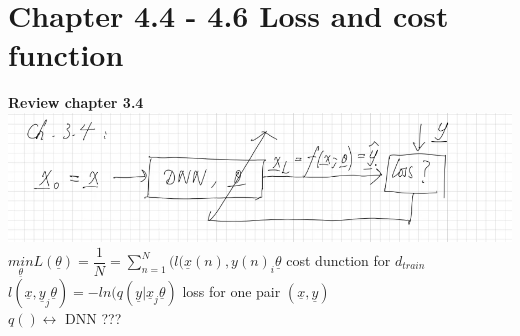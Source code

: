 \section{Chapter 4.4 - 4.6 Loss and cost function}
\textbf{Review chapter 3.4}	\\
\includegraphics[width=\linewidth]{Images/ProbabalisticFrameworkSupervisedLearning.png}\\
$ \underset{\underline{\theta}}{min}  L ( \underline{\theta  }) =  \dfrac{1}{N} = \sum_{n=1}^{N} (l(\underline{x}(n), y(n)_i \underline{\theta}$     cost dunction for $ d_{train } $ \\
$l(\underline{x}, \underline{y}_j \underline{\theta }) = - ln(q ( \underline{y} | \underline{x}_j \underline{\theta } )  $ loss for one pair $  (\underline{x}, \underline{y})  $ \\
$  q () \leftrightarrow $ DNN ???\\


	
	
	
	
	
	
	
	
	
	
	
	
	
	
	
	
	
	
	
	
	
	
	
	
	
	
	
	
	
	
	
	
	
	
	
	
	
	
	
	
	
	
	
	
	